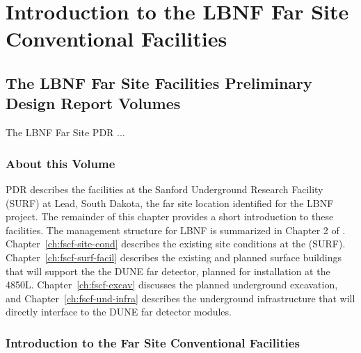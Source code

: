 \chapter{Introduction to the LBNF Far Site Conventional Facilities}
\label{ch:fscf-intro}


\section{The LBNF Far Site Facilities Preliminary Design Report Volumes}
\label{sec:pdr-volumes-fscf}

The LBNF Far Site PDR ... 




\subsection{About this Volume}
\label{sec:pdr-volumes-vol1}

PDR \volfscf{} describes the facilities at the Sanford Underground Research Facility (SURF) 
 at Lead, South Dakota, the far site location identified for the LBNF project.
 The remainder of this chapter provides a short introduction to these facilities.  The management structure for LBNF is summarized in Chapter 2 of \volintro.
Chapter~\ref{ch:fscf-site-cond} describes the existing site conditions at the (SURF). 
Chapter~\ref{ch:fscf-surf-facil} describes the existing and planned surface buildings that will support the the DUNE far detector, planned for installation at the 4850L. 
Chapter~\ref{ch:fscf-excav} discusses the planned underground excavation, and 
Chapter~\ref{ch:fscf-und-infra}  describes the underground infrastructure that will directly interface to the DUNE far detector modules.

\subsection{Introduction to the Far Site Conventional Facilities}
\label{sec:fs-facil-cf}

